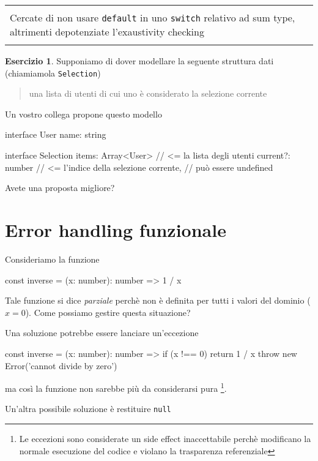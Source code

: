 \documentclass[12pt]{article}
\theoremstyle{definition}
\newtheorem{exercise}{Esercizio}[subsection]
\newenvironment{boxed}
    {\begin{center}
    \begin{tabular}{|p{0.9\textwidth}|}
    \hline\\
    }
    {
    \\\\\hline
    \end{tabular}
    \end{center}
    }
\newenvironment{code}
  {\vspace{0.5cm} \VerbatimEnvironment\begin{typescriptcode}}
  {\end{typescriptcode} \vspace{0.2cm}}
\begin{document}
\begin{boxed}
Cercate di non usare \texttt{default} in uno \texttt{switch} relativo ad sum type, altrimenti depotenziate l'exaustivity checking
\end{boxed}

\begin{exercise}
Supponiamo di dover modellare la seguente struttura dati (chiamiamola \texttt{Selection})

\begin{quote}
una lista di utenti di cui uno è considerato la selezione corrente
\end{quote}

Un vostro collega propone questo modello

\begin{code}
interface User {
  name: string
}

interface Selection {
  items: Array<User> // <= la lista degli utenti
  current?: number   // <= l'indice della selezione corrente,
                     // può essere undefined
}
\end{code}

Avete una proposta migliore?
\end{exercise}

\newpage
\section{Error handling funzionale}

Consideriamo la funzione

\begin{code}
const inverse = (x: number): number => 1 / x
\end{code}

Tale funzione si dice \emph{parziale} perchè non è definita per tutti i valori del dominio ($x = 0$).
Come possiamo gestire questa situazione?

Una soluzione potrebbe essere lanciare un'eccezione

\begin{code}
const inverse = (x: number): number => {
  if (x !== 0) return 1 / x
  throw new Error('cannot divide by zero')
}
\end{code}

ma così la funzione non sarebbe più da considerarsi pura
\footnote{Le eccezioni sono considerate un side effect inaccettabile perchè modificano la normale esecuzione del codice
e violano la trasparenza referenziale}.

Un'altra possibile soluzione è restituire \texttt{null}
\end{document}
